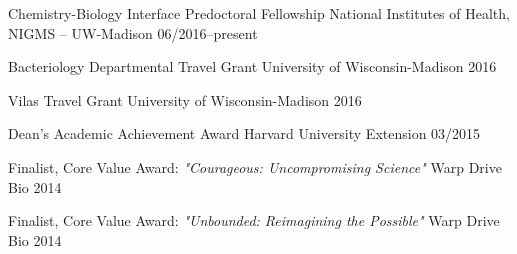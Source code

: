 



\begin{cvhonors}

  \cvhonor
    {Chemistry-Biology Interface Predoctoral Fellowship} %
    {National Institutes of Health, NIGMS -- UW-Madison} %
    {06/2016--present} %

  \cvhonor
    {Bacteriology Departmental Travel Grant} %
    {University of Wisconsin-Madison} %
    {2016} %

  \cvhonor
    {Vilas Travel Grant} %
    {University of Wisconsin-Madison} %
    {2016} %

  \cvhonor
    {Dean's Academic Achievement Award} %
    {Harvard University Extension} %
    {03/2015} %

  \cvhonor
    {Finalist, Core Value Award: \textit{"Courageous: Uncompromising Science"}} %
    {Warp Drive Bio} %
    {2014} %
    
  \cvhonor
    {Finalist, Core Value Award: \textit{"Unbounded: Reimagining the Possible"}} %
    {Warp Drive Bio} %
    {2014} %

\end{cvhonors}
